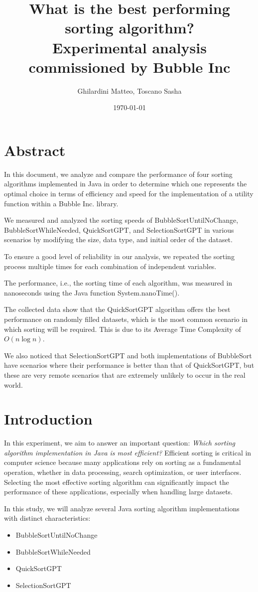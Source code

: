 \documentclass{article}
\title{What is the best performing sorting algorithm? \\ \large Experimental analysis commissioned by Bubble Inc}
\author{Ghilardini Matteo, Toscano Sasha}
\date{\today}
\begin{document}
\maketitle

\section*{Abstract}
In this document, we analyze and compare the performance of four sorting algorithms implemented in Java in order to determine which one represents the optimal choice in terms of efficiency and speed for the implementation of a utility function within a Bubble Inc. library.

We measured and analyzed the sorting speeds of BubbleSortUntilNoChange, BubbleSortWhileNeeded, QuickSortGPT, and SelectionSortGPT in various scenarios by modifying the size, data type, and initial order of the dataset.

To ensure a good level of reliability in our analysis, we repeated the sorting process multiple times for each combination of independent variables.

The performance, i.e., the sorting time of each algorithm, was measured in nanoseconds using the Java function System.nanoTime().

The collected data show that the QuickSortGPT algorithm offers the best performance on randomly filled datasets, which is the most common scenario in which sorting will be required. This is due to its Average Time Complexity of $O(n \log n)$.

We also noticed that SelectionSortGPT and both implementations of BubbleSort have scenarios where their performance is better than that of QuickSortGPT, but these are very remote scenarios that are extremely unlikely to occur in the real world.


\section{Introduction}
In this experiment, we aim to answer an important question: \textit{Which sorting algorithm implementation in Java is most efficient?} Efficient sorting is critical in computer science because many applications rely on sorting as a fundamental operation, whether in data processing, search optimization, or user interfaces. Selecting the most effective sorting algorithm can significantly impact the performance of these applications, especially when handling large datasets.

In this study, we will analyze several Java sorting algorithm implementations with distinct characteristics:
\begin{itemize}
    \item BubbleSortUntilNoChange
    \item BubbleSortWhileNeeded
    \item QuickSortGPT
    \item SelectionSortGPT
\end{itemize}
\end{document}
